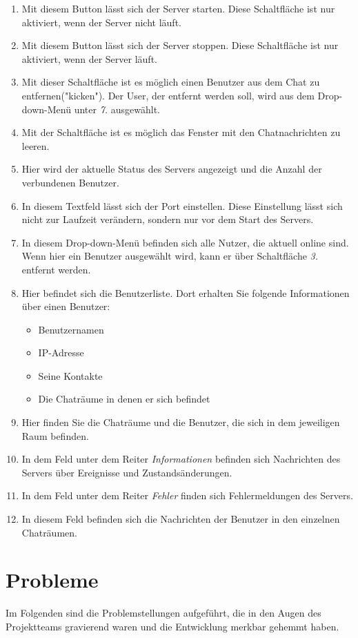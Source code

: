 \documentclass[12pt,a4paper,bibliography=totocnumbered,listof=totocnumbered]{scrartcl}
\begin{document}
\begin{enumerate}
	\item Mit diesem Button lässt sich der Server starten. Diese Schaltfläche ist nur aktiviert, wenn der Server nicht läuft.
	\item Mit diesem Button lässt sich der Server stoppen. Diese Schaltfläche ist nur aktiviert, wenn der Server läuft.
	\item Mit dieser Schaltfläche ist es möglich einen Benutzer aus dem Chat zu entfernen("kicken"). Der User, der entfernt werden soll, wird aus dem Drop-down-Menü unter \textit{7.} ausgewählt.
	\item Mit der Schaltfläche ist es möglich das Fenster mit den Chatnachrichten zu leeren.
	\item Hier wird der aktuelle Status des Servers angezeigt und die Anzahl der verbundenen Benutzer.
	\item In diesem Textfeld lässt sich der Port einstellen. Diese Einstellung lässt sich nicht zur Laufzeit verändern, sondern nur vor dem Start des Servers.
	\item In diesem Drop-down-Menü befinden sich alle Nutzer, die aktuell online sind. Wenn hier ein Benutzer ausgewählt wird, kann er über Schaltfläche \textit{3.} entfernt werden.
	\item Hier befindet sich die Benutzerliste. Dort erhalten Sie folgende Informationen über einen Benutzer:
		\begin{itemize}
			\item Benutzernamen
			\item IP-Adresse
			\item Seine Kontakte
			\item Die Chaträume in denen er sich befindet
		\end{itemize}
	
	\item Hier finden Sie die Chaträume und die Benutzer, die sich in dem jeweiligen Raum befinden.
	\item In dem Feld unter dem Reiter \textit{Informationen} befinden sich Nachrichten des Servers über Ereignisse und Zustandsänderungen.
	\item In dem Feld unter dem Reiter \textit{Fehler} finden sich Fehlermeldungen des Servers.
	\item In diesem Feld befinden sich die Nachrichten der Benutzer in den einzelnen Chaträumen.
\end{enumerate}
\section{Probleme}
Im Folgenden sind die Problemstellungen aufgeführt, die in den Augen des Projektteams gravierend waren und die Entwicklung merkbar gehemmt haben.
\end{document}
